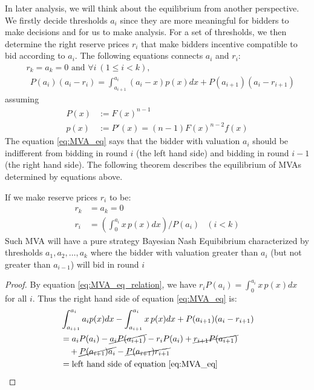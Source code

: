 In later analysis, we will think about the equilibrium from another
perspective.  We firstly decide thresholds $a_i$ since they are more meaningful
for bidders to make decisions and for us to make analysis. For a set of
thresholds, we then determine the right reserve prices $r_i$ that make bidders
incentive compatible to bid according to $a_i$. The following equations
connects $a_i$ and $r_i$:
\begin{align}\label{eq:MVA_eq}
    &r_k = a_k = 0 \mbox{ and }
    \forall i ~(1 \leq i < k),\nonumber\\
    &~~P(a_{i})(a_{i}-r_i) =
    \int_{a_{i+1}}^{a_{i}}(a_{i}-x)p(x)dx+P(a_{i+1})(a_{i}-r_{i+1})
\end{align}
assuming
\begin{align*}
    P(x) &:= F(x)^{n-1}\\
    p(x) &:= P'(x) = (n-1)F(x)^{n-2} f(x)
\end{align*}
The equation \ref{eq:MVA_eq} says that the bidder with valuation $a_i$ should be
indifferent from bidding in round $i$ (the left hand side) and bidding in round
$i-1$(the right hand side).  The following theorem describes the equilibrium of
MVAs determined by equations above.

\begin{theorem}
If we make reserve prices $r_i$ to be:
\begin{align}\label{eq:MVA_eq_relation}
  r_k &= a_k = 0 \nonumber \\
  r_i &= \left( \int_{0}^{a_i} x \, p(x) dx \right) / P(a_i) & (i < k)
\end{align}
Such MVA will have a pure strategy Bayesian Nash Equibibrium characterized by
thresholds $a_1, a_2, \ldots, a_k$ where the bidder with valuation greater than
$a_i$ (but not greater than $a_{i-1}$) will bid in round $i$
\end{theorem}

\begin{proof}
By equation \ref{eq:MVA_eq_relation}, we have $r_i P(a_i) = \int_{0}^{a_i}
x\,p(x)dx$ for all $i$. Thus the right
hand side of equation \ref{eq:MVA_eq} is:
\begin{align*}
	& \int_{a_{i+1}}^{a_i} a_i p(x) dx - \int_{a_{i+1}}^{a_i} x \, p(x) dx + P(a_{i+1})(a_i-r_{i+1}) \\
	&= a_i P(a_i) - \cancel{a_i P(a_{i+1})} - r_i P(a_i) + \cancel{r_{i+1} P(a_{i+1})} \\
		& ~~~ + \cancel{P(a_{i+1}) a_i} - \cancel{P(a_{i+1}) r_{i+1}}\\
	&= \mbox{left hand side of equation \ref{eq:MVA_eq}}
\end{align*}
\end{proof}

